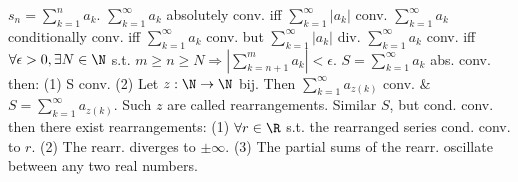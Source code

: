  $s_n = \sum_{k=1}^n a_k$.
$\sum_{k=1}^\infty a_k$ absolutely conv. iff
$\sum_{k=1}^\infty |a_k|$ conv.
$\sum_{k=1}^\infty a_k$ conditionally conv. iff
$\sum_{k=1}^\infty a_k$ conv. but
$\sum_{k=1}^\infty |a_k|$ div.
$\sum_{k=1}^\infty a_k$ conv. iff
$\forall \epsilon > 0, \exists N \in \N$ s.t.
$m \ge n \ge N \Rightarrow |\sum_{k=n+1}^m a_k| < \epsilon$.
 $S = \sum_{k=1}^\infty a_k$ abs. conv. then:
(1) S conv.
(2) Let $z: \N \to \N$ bij. Then $\sum_{k=1}^\infty a_{z(k)}$ conv. \& $S = \sum_{k=1}^\infty a_{z(k)}$.
Such $z$ are called rearrangements.
 Similar $S$, but cond. conv. then there exist rearrangements:
(1) $\forall r \in \R$ s.t. the rearranged series cond. conv. to $r$.
(2) The rearr. diverges to $\pm \infty$.
(3) The partial sums of the rearr. oscillate between any two real numbers.
